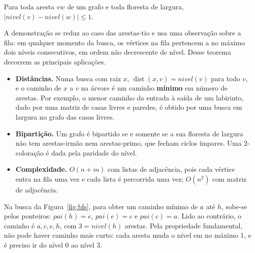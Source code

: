 \begin{teo}
Para toda aresta $vw$ de um grafo e toda floresta de largura, $|nivel(v)-nivel(w)|\le1$.
\end{teo}
A demonstração se reduz ao caso das arestas-tio e usa uma observação sobre a fila: em qualquer momento da busca, os vértices na fila pertencem a no máximo dois níveis consecutivos, em ordem não decrescente de nível. Desse teorema decorrem as principais aplicações.
\begin{itemize}
  \item \textbf{Distâncias.} Numa busca com raiz $x$, $\operatorname{dist}(x,v)=nivel(v)$ para todo $v$, e o caminho de $x$ a $v$ na árvore é um caminho \textbf{mínimo} em número de arestas. Por exemplo, o menor caminho da entrada à saída de um labirinto, dado por uma matriz de casas livres e paredes, é obtido por uma busca em largura no grafo das casas livres.
  \item \textbf{Bipartição.} Um grafo é bipartido se e somente se a sua floresta de largura não tem arestas-irmão nem arestas-primo, que fecham ciclos ímpares. Uma 2-coloração é dada pela paridade do nível.
  \item \textbf{Complexidade.} $O(n+m)$ com listas de adjacência, pois cada vértice entra na fila uma vez e cada lista é percorrida uma vez; $O(n^2)$ com matriz de adjacência.
\end{itemize}

\begin{exemplo}\label{ex:bfscaminho}
Na busca da Figura~\ref{fig:bfs}, para obter um caminho mínimo de $a$ até $h$, sobe-se pelos ponteiros: $pai(h)=e$, $pai(e)=c$ e $pai(c)=a$. Lido ao contrário, o caminho é $a,c,e,h$, com $3=nivel(h)$ arestas. Pela propriedade fundamental, não pode haver caminho mais curto: cada aresta muda o nível em no máximo 1, e é preciso ir do nível 0 ao nível 3.
\end{exemplo}

